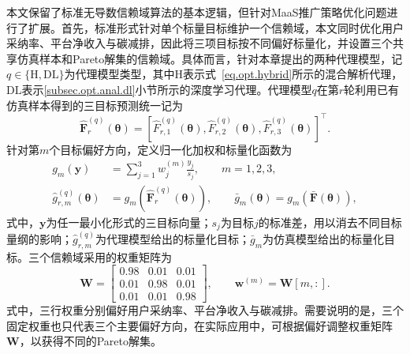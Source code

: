 本文保留了标准无导数信赖域算法的基本逻辑，但针对MaaS推广策略优化问题进行了扩展。首先，标准形式针对单个标量目标维护一个信赖域，本文同时优化用户采纳率、平台净收入与碳减排，因此将三项目标按不同偏好标量化，并设置三个共享仿真样本和Pareto解集的信赖域。具体而言，针对本章提出的两种代理模型，记$q\in\{\mathrm{H},\mathrm{DL}\}$为代理模型类型，其中$\mathrm{H}$表示式~\eqref{eq.opt.hybrid}所示的混合解析代理，$\mathrm{DL}$表示\ref{subsec.opt.anal.dl}小节所示的深度学习代理。代理模型$q$在第$r$轮利用已有仿真样本得到的三目标预测统一记为
\begin{equation}
\widehat{\bm F}_{r}^{(q)}\left(\bm{\theta}\right)
=
\left[
\widehat F_{r,1}^{(q)}\left(\bm{\theta}\right),
\widehat F_{r,2}^{(q)}\left(\bm{\theta}\right),
\widehat F_{r,3}^{(q)}\left(\bm{\theta}\right)
\right]^{\top}.
\label{eq.opt.trsurrogate}
\end{equation}
针对第$m$个目标偏好方向，定义归一化加权和标量化函数为
\begin{equation}
\begin{aligned}
g_{m}\left(\bm{y}\right)
&=\sum_{j=1}^{3}w_{j}^{(m)}\frac{y_{j}}{s_{j}},
\qquad m=1,2,3,\\
\widehat g_{r,m}^{(q)}\left(\bm{\theta}\right)
&=g_{m}\left(\widehat{\bm F}_{r}^{(q)}\left(\bm{\theta}\right)\right),
\qquad
\bar g_{m}\left(\bm{\theta}\right)
=g_{m}\left(\bar{\bm F}\left(\bm{\theta}\right)\right),
\end{aligned}
\label{eq.opt.scalar}
\end{equation}
式中，$\bm{y}$为任一最小化形式的三目标向量；$s_j$为目标$j$的标准差，用以消去不同目标量纲的影响；$\widehat g_{r,m}^{(q)}$为代理模型给出的标量化目标；$\bar g_m$为仿真模型给出的标量化目标。三个信赖域采用的权重矩阵为
\begin{equation}
\bm W=
\begin{bmatrix}
0.98&0.01&0.01\\
0.01&0.98&0.01\\
0.01&0.01&0.98
\end{bmatrix},
\qquad
\bm w^{(m)}=\bm W\left[m,:\right].
\label{eq.opt.weights}
\end{equation}
式中，三行权重分别偏好用户采纳率、平台净收入与碳减排。需要说明的是，三个固定权重也只代表三个主要偏好方向，在实际应用中，可根据偏好调整权重矩阵$\bm W$，以获得不同的Pareto解集。

